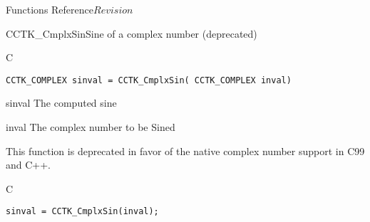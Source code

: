 \begin{cactuspart}{ Functions Reference}{}{$Revision$}
\begin{FunctionDescription}{CCTK\_CmplxSin}{Sine of a complex number (deprecated)}
\label{CCTK-CmplxSin}
\begin{SynopsisSection}
\begin{Synopsis}{C}
\begin{verbatim}CCTK_COMPLEX sinval = CCTK_CmplxSin( CCTK_COMPLEX inval)\end{verbatim}
\end{Synopsis}
\end{SynopsisSection}
\begin{ParameterSection}
\begin{Parameter}{sinval}
The computed sine
\end{Parameter}
\begin{Parameter}{inval}
The complex number to be Sined
\end{Parameter}
\end{ParameterSection}
\begin{Discussion}
This function is deprecated in favor of the native complex number support in
C99 and C++.
\end{Discussion}
\begin{ExampleSection}
\begin{Example}{C}
\begin{verbatim}
sinval = CCTK_CmplxSin(inval);
\end{verbatim}
\end{Example}
\end{ExampleSection}
\end{FunctionDescription}


\end{cactuspart}
